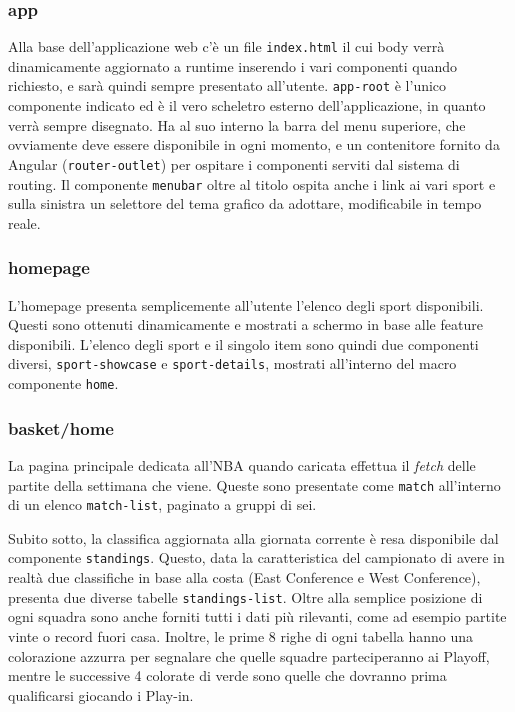 \subsubsection{app}
Alla base dell'applicazione web c'è un file \texttt{index.html} il cui body verrà dinamicamente aggiornato a runtime inserendo i vari componenti quando richiesto, e sarà quindi sempre presentato all'utente. 
\texttt{app-root} è l'unico componente indicato ed è il vero scheletro esterno dell'applicazione, in quanto verrà sempre disegnato. Ha al suo interno la barra del menu superiore, che ovviamente deve essere disponibile in ogni momento, e un contenitore fornito da Angular (\texttt{router-outlet}) per ospitare i componenti serviti dal sistema di routing. 
Il componente \texttt{menubar} oltre al titolo ospita anche i link ai vari sport e sulla sinistra un selettore del tema grafico da adottare, modificabile in tempo reale. 

\subsubsection{homepage}
L'homepage presenta semplicemente all'utente l'elenco degli sport disponibili. Questi sono ottenuti dinamicamente e mostrati a schermo in base alle feature disponibili. L'elenco degli sport e il singolo item sono quindi due componenti diversi, \texttt{sport-showcase} e \texttt{sport-details}, mostrati all'interno del macro componente \texttt{home}.

\subsubsection{basket/home}
La pagina principale dedicata all'NBA quando caricata effettua il \textit{fetch} delle partite della settimana che viene. Queste sono presentate come \texttt{match} all'interno di un elenco \texttt{match-list}, paginato a gruppi di sei. 

Subito sotto, la classifica aggiornata alla giornata corrente è resa disponibile dal componente \texttt{standings}. Questo, data la caratteristica del campionato di avere in realtà due classifiche in base alla costa (East Conference e West Conference), presenta due diverse tabelle \texttt{standings-list}. Oltre alla semplice posizione di ogni squadra sono anche forniti tutti i dati più rilevanti, come ad esempio partite vinte o record fuori casa.
Inoltre, le prime 8 righe di ogni tabella hanno una colorazione azzurra per segnalare che quelle squadre parteciperanno ai Playoff, mentre le successive 4 colorate di verde sono quelle che dovranno prima qualificarsi giocando i Play-in. 

